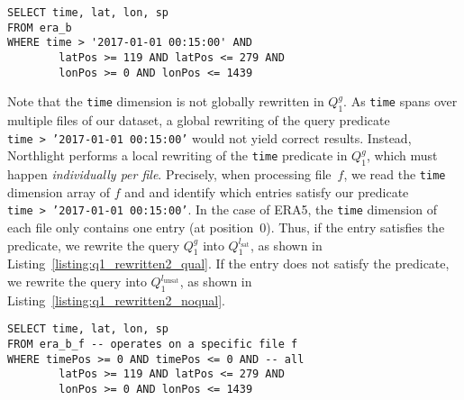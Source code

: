 \documentclass[conference]{IEEEtran}
\newcommand{\system}{Northlight}
\newcommand{\smalltt}[1]{{\texttt{\small #1}}}
\begin{document}
\noindent 
\begin{minipage}{\linewidth}
\begin{lstlisting}[style=sql, caption={Globally rewritten query~$Q_1^{g}$. Predicates are valid with respect to the global coordinate system of the dataset.}, label={listing:q1_rewritten1}]
SELECT time, lat, lon, sp
FROM era_b
WHERE time > '2017-01-01 00:15:00' AND 
        latPos >= 119 AND latPos <= 279 AND
        lonPos >= 0 AND lonPos <= 1439
\end{lstlisting}
\end{minipage}

%

Note that the \smalltt{time} dimension is not globally rewritten in $Q_1^g$. As \smalltt{time} spans over multiple files of our dataset, a global rewriting of the query predicate \smalltt{time~>~'2017-01-01~00:15:00'} would not yield correct results.
Instead, \system{} performs a local rewriting of the \smalltt{time} predicate in $Q_1^g$, which must happen \textit{individually per file}. Precisely, when processing file~$f$, we read the \smalltt{time} dimension array of $f$ and and identify which entries satisfy our predicate \smalltt{time~>~'2017-01-01~00:15:00'}. In the case of ERA5, the \smalltt{time} dimension of each file only contains one entry (at position~$0$). Thus, if the entry satisfies the predicate, we rewrite the query $Q_1^g$ into $Q_1^{l_{\text{sat}}}$, as shown in Listing~\ref{listing:q1_rewritten2_qual}. If the entry does not satisfy the predicate, we rewrite the query into $Q_1^{l_{\text{unsat}}}$, as shown in Listing~\ref{listing:q1_rewritten2_noqual}. 

\noindent 
\begin{minipage}{\linewidth}
\begin{lstlisting}[style=sql, caption={Locally rewritten query~$Q_1^{l_{\text{sat}}}$, which will be executed on a file that \textbf{satisfies} the \smalltt{time}-predicate.}, label={listing:q1_rewritten2_qual}]
SELECT time, lat, lon, sp
FROM era_b_f -- operates on a specific file f
WHERE timePos >= 0 AND timePos <= 0 AND -- all
        latPos >= 119 AND latPos <= 279 AND
        lonPos >= 0 AND lonPos <= 1439
\end{lstlisting}
\end{minipage}
\end{document}
